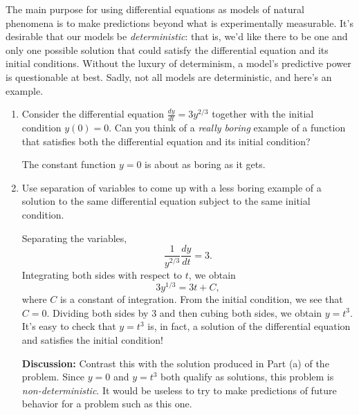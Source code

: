 \documentclass[main]{subfiles}
\begin{document}
\begin{enumerate}
  The main purpose for using differential equations as models of
  natural phenomena is to make predictions beyond what is experimentally
  measurable.  It's desirable that our models be {\em deterministic}:
  that is, we'd like there to be one and only one possible solution that could
  satisfy the differential equation and its initial conditions.  Without
  the luxury of determinism, a model's predictive power is questionable
  at best.  Sadly, not all models are deterministic, and here's an example.

  \begin{enumerate}
  \item
  \begin{problem}[0.75in]
    Consider the differential equation $\displaystyle \frac{dy}{dt} = 3 y^{2/3}$
    together with the initial condition $y(0) = 0$.  Can you think of a {\em really
    boring} example of a function that satisfies both the differential
    equation and its initial condition?    
  \end{problem}  

  \begin{solution}
    The constant function $y = 0$ is about as boring as it gets.
  \end{solution}

  \item
  \begin{problem}[2.5in]
    Use separation of variables to come up with a less boring example
    of a solution to the same differential equation subject to the same
    initial condition.  
  \end{problem}  

  \begin{solution}
    Separating the variables,
    $$
	\frac{1}{y^{2/3}} \frac{dy}{dt} = 3.
    $$
    Integrating both sides with respect to $t$, we obtain
    $$
	3y^{1/3} = 3t + C,
    $$
    where $C$ is a constant of integration.  From the initial condition,
    we see that $C = 0$.  Dividing both sides by $3$ and then cubing both
    sides, we obtain $y = t^3$.  It's easy to check that $y = t^3$ is,
    in fact, a solution of the differential equation and satisfies the
    initial condition!

    {\bf Discussion:}  Contrast this with the solution produced in Part (a)
    of the problem.  Since $y = 0$ and $y = t^3$ both qualify as solutions,
    this problem is {\em non-deterministic}.  It would be useless to try
    to make predictions of future behavior for a problem such as this one.    


\end{solution}
\end{enumerate}
\end{enumerate}
\end{document}
